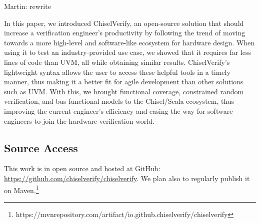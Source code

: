 \documentclass[conference]{IEEEtran}
\newcommand{\martin}[1]{{\color{blue} Martin: #1}}
\begin{document}
\martin{rewrite}

In this paper, we introduced ChiselVerify, an open-source solution that should increase a verification engineer's productivity by following the trend of moving towards a more high-level and software-like ecosystem for hardware design. 
When using it to test an industry-provided use case, we showed that it requires far less lines of code than UVM, all while obtaining similar results.
ChiselVerify's lightweight syntax allows the user to access these helpful tools in a timely manner, thus making it a better fit for agile development than other solutions such as UVM.
With this, we brought functional coverage, constrained random verification, and bus functional models to the Chisel/Scala ecosystem, thus improving the current engineer's efficiency and easing the way for software engineers to join the hardware verification world.

\subsection*{Source Access}

This work is in open source and hosted at GitHub:\\ \url{https://github.com/chiselverify/chiselverify}.
We plan also to regularly publish it on Maven.\footnote{https://mvnrepository.com/artifact/io.github.chiselverify/chiselverify}



\end{document}
